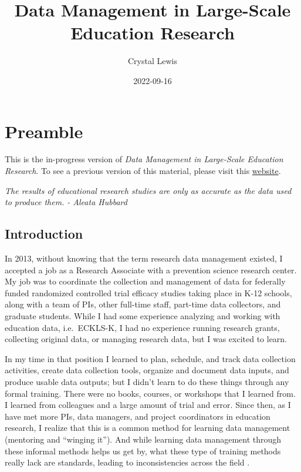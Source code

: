 \documentclass[
]{book}
\title{Data Management in Large-Scale Education Research}
\author{Crystal Lewis}
\date{2022-09-16}
\begin{document}
\maketitle

{
\setcounter{tocdepth}{1}
\tableofcontents
}
\hypertarget{preamble}{%
\chapter{Preamble}\label{preamble}}

This is the in-progress version of \emph{Data Management in Large-Scale Education Research}. To see a previous version of this material, please visit this \href{https://cghlewis.github.io/mpsi-data-training/}{website}.

\emph{The results of educational research studies are only as accurate as the data used to produce them.}
\emph{- Aleata Hubbard} \autocite{hubbard_data_2017}

\hypertarget{introduction}{%
\section{Introduction}\label{introduction}}

In 2013, without knowing that the term research data management existed, I accepted a job as a Research Associate with a prevention science research center. My job was to coordinate the collection and management of data for federally funded randomized controlled trial efficacy studies taking place in K-12 schools, along with a team of PIs, other full-time staff, part-time data collectors, and graduate students. While I had some experience analyzing and working with education data, i.e.~ECKLS-K, I had no experience running research grants, collecting original data, or managing research data, but I was excited to learn.

In my time in that position I learned to plan, schedule, and track data collection activities, create data collection tools, organize and document data inputs, and produce usable data outputs; but I didn't learn to do these things through any formal training. There were no books, courses, or workshops that I learned from. I learned from colleagues and a large amount of trial and error. Since then, as I have met more PIs, data managers, and project coordinators in education research, I realize that this is a common method for learning data management (mentoring and ``winging it''). And while learning data management through these informal methods helps us get by, what these type of training methods really lack are standards, leading to inconsistencies across the field \autocite{borghi_promoting_2022}.
\end{document}

